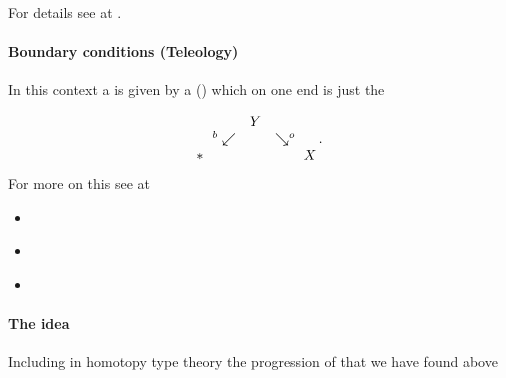 \documentclass[12pt,titlepage]{article}
\def\mathllap{\mathpalette\mathllapinternal}
\def\mathrlap{\mathpalette\mathrlapinternal}
\def\mathllapinternal#1#2{\llap{$\mathsurround=0pt#1{#2}$}}
\def\mathrlapinternal#1#2{\rlap{$\mathsurround=0pt#1{#2}$}}
\newcommand{\itexarray}[1]{\begin{matrix}#1\end{matrix}}
\theoremstyle{plain}
\theoremstyle{definition}
\theoremstyle{remark}
\begin{document}
For details see at \emph{}.

\hypertarget{boundary_conditions_teleology}{}\paragraph*{{Boundary conditions (Teleology)}}\label{boundary_conditions_teleology}

In this context a  is given by a ()  which on one end is just the 

\begin{displaymath}
\itexarray{
    && Y
    \\
    & {}^{\mathllap{b}}\swarrow && \searrow^{\mathrlap{o}}
    \\
    \ast && && X
  }
  \,.
\end{displaymath}
For more on this see at

\begin{itemize}%
\item \emph{}


\item \emph{}


\item \emph{}



\end{itemize}
\hypertarget{TheIdea}{}\paragraph*{{The idea}}\label{TheIdea}

Including in homotopy type theory the progression of  that we have found above
\end{document}

